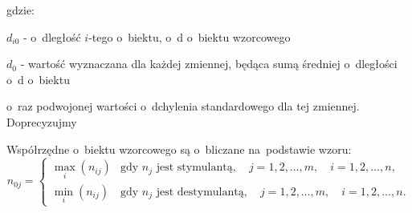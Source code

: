 \documentclass[12pt,a4paper]{report}
\begin{document}
gdzie:

$d_{i0}$ - o~dległość $i$-tego o~biektu, o~d o~biektu wzorcowego

$d_{0}$ - wartość wyznaczana dla każdej zmiennej, będąca sumą średniej o~dległości o~d o~biektu

 o~raz podwojonej wartości o~dchylenia standardowego dla tej zmiennej. Doprecyzujmy

Współrzędne o~biektu wzorcowego są o~bliczane na~podstawie wzoru:
$$n_{0j}=\left\{ \begin{array}{ll}
\max\limits_{i} (n_{ij}) & \textrm{gdy } n_{j} \textrm{ jest stymulantą},\quad j=1,2,\dots,m, \quad i=1,2,\dots,n, \\
\min\limits_{i} (n_{ij}) & \textrm{gdy } n_{j} \textrm{ jest destymulantą}, \quad j=1,2,\dots,m, \quad i=1,2,\dots,n.
\end{array} \right. $$
\end{document}
